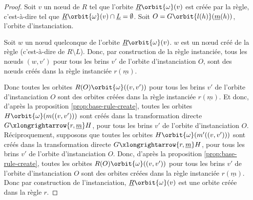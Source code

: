 \begin{proof}
	Soit $v$ un nœud de $R$ tel que l'orbite $\underline{R}\orbit{\omega}(v)$ est créée
	par la règle, c'est-à-dire tel que
	$\underline{R}\orbit{\omega}(v) \cap \underline{L} = \emptyset$. Soit
	$O = G\orbit{l(h)}(\underline{m}(h))$, l'orbite d'instanciation.

	Soit $w$ un nœud quelconque de l'orbite $\underline{R}\orbit{\omega}(v)$. $w$ est un
	nœud créé de la règle (c'est-à-dire de $R \setminus L$). %
	Donc, par construction de la règle instanciée,
	tous les nœuds $(w,v')$ pour tous les brins $v'$ de l'orbite d'instanciation
	$O$, sont des nœuds créés dans la règle instanciée $r(\underline{m})$.

	Donc toutes les orbites $R(O)\orbit{\omega}((v,v'))$ pour tous les brins $v'$ de
	l'orbite d'instanciation $O$ sont des orbites créées dans la règle instanciée
	$r(\underline{m})$. Et donc, d'après la proposition \ref{prop:base-rule-create},
	toutes les orbites $H\orbit{\omega}(m((v,v')))$ sont créés dans la transformation
	directe $G \xlongrightarrow{r, \underline{m}} H$, pour tous les brins $v'$ de l'orbite
	d'instanciation $O$.
	\\

	Réciproquement, supposons que toutes les orbites $H\orbit{\omega}(m'((v,v')))$ sont créés dans la transformation directe $G \xlongrightarrow{r, \underline{m}} H$, pour tous les brins $v'$ de l'orbite d'instanciation $O$.
	Donc, d'après la proposition \ref{prop:base-rule-create}, toutes les orbites $R(O)\orbit{\omega}((v,v'))$ pour tous les brins $v'$ de l'orbite d'instanciation $O$ sont des orbites créées dans la règle instanciée $r(\underline{m})$.
	Donc par construction de l'instanciation, $\underline{R}\orbit{\omega}(v)$ est une orbite créée dans la règle $r$.
\end{proof}

